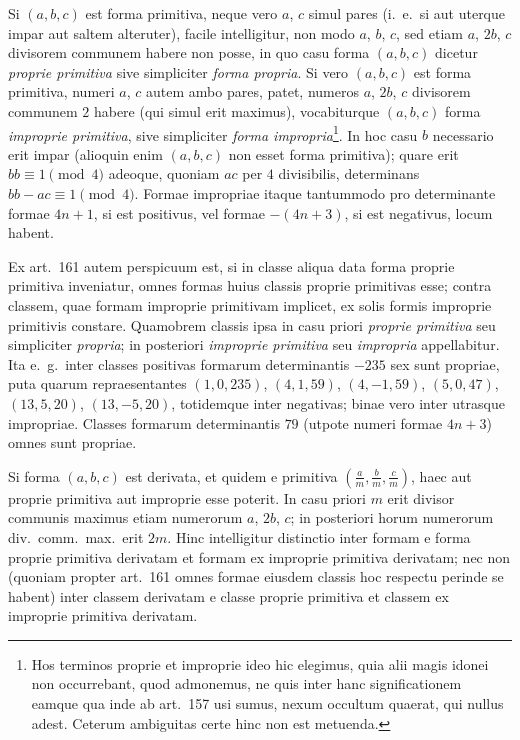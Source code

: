 \documentclass[12pt,a4paper]{article}
\theoremstyle{plain}
\theoremstyle{definition}
\theoremstyle{remark}
\begin{document}
Si $(a,b,c)$ est forma primitiva, neque vero $a$, $c$ simul pares (i.\ e.\ si aut uterque impar aut saltem alteruter), facile intelligitur, non modo $a$, $b$, $c$, sed etiam $a$, $2b$, $c$ divisorem communem habere non posse, in quo casu forma $(a,b,c)$ dicetur \emph{proprie primitiva} sive simpliciter \emph{forma propria}. Si vero $(a,b,c)$ est forma primitiva, numeri $a$, $c$ autem ambo pares, patet, numeros $a$, $2b$, $c$ divisorem communem $2$ habere (qui simul erit maximus), vocabiturque $(a,b,c)$ forma \emph{improprie primitiva}, sive simpliciter \emph{forma impropria}\footnote{Hos terminos proprie et improprie ideo hic elegimus, quia alii magis idonei non occurrebant, quod admonemus, ne quis inter hanc significationem eamque qua inde ab art.\ 157 usi sumus, nexum occultum quaerat, qui nullus adest. Ceterum ambiguitas certe hinc non est metuenda.}. In hoc casu $b$ necessario erit impar (alioquin enim $(a,b,c)$ non esset forma primitiva); quare erit $bb\equiv 1\pmod{4}$ adeoque, quoniam $ac$ per $4$ divisibilis, determinans $bb-ac\equiv 1\pmod{4}$. Formae impropriae itaque tantummodo pro determinante formae $4n+1$, si est positivus, vel formae $-(4n+3)$, si est negativus, locum habent.

Ex art.\ 161 autem perspicuum est, si in classe aliqua data forma proprie primitiva inveniatur, omnes formas huius classis proprie primitivas esse; contra classem, quae formam improprie primitivam implicet, ex solis formis improprie primitivis constare. Quamobrem classis ipsa in casu priori \emph{proprie primitiva} seu simpliciter \emph{propria}; in posteriori \emph{improprie primitiva} seu \emph{impropria} appellabitur. Ita e.\ g.\ inter classes positivas formarum determinantis $-235$ sex sunt propriae, puta quarum repraesentantes $(1,0,235)$, $(4,1,59)$, $(4,-1,59)$, $(5,0,47)$, $(13,5,20)$, $(13,-5,20)$, totidemque inter negativas; binae vero inter utrasque impropriae. Classes formarum determinantis $79$ (utpote numeri formae $4n+3$) omnes sunt propriae.

Si forma $(a,b,c)$ est derivata, et quidem e primitiva $(\frac{a}{m},\frac{b}{m},\frac{c}{m})$, haec aut proprie primitiva aut improprie esse poterit. In casu priori $m$ erit divisor communis maximus etiam numerorum $a$, $2b$, $c$; in posteriori horum numerorum div.\ comm.\ max.\ erit $2m$. Hinc intelligitur distinctio inter formam e forma proprie primitiva derivatam et formam ex improprie primitiva derivatam; nec non (quoniam propter art.\ 161 omnes formae eiusdem classis hoc respectu perinde se habent) inter classem derivatam e classe proprie primitiva et classem ex improprie primitiva derivatam.
\end{document}
